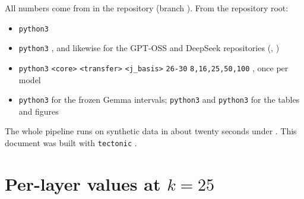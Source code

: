 \documentclass[11pt,a4paper]{article}
\begin{document}
All numbers come from  in the repository (branch ). From the repository root:
\begin{itemize}[leftmargin=1.4em,itemsep=0.1em]\raggedright
\item \texttt{python3} 
\item \texttt{python3}   , and likewise for the GPT-OSS and DeepSeek repositories (, )
\item \texttt{python3}   \texttt{<core>}  \texttt{<transfer>}  \texttt{<j\_basis>}  \texttt{26-30}  \texttt{8,16,25,50,100}    , once per model
\item \texttt{python3}  for the frozen Gemma intervals; \texttt{python3}  and \texttt{python3}  for the tables and figures
\end{itemize}
The whole pipeline runs on synthetic data in about twenty seconds under . This document was built with \texttt{tectonic} .

\clearpage
\appendix
\section{Per-layer values at $k=25$}
\end{document}
